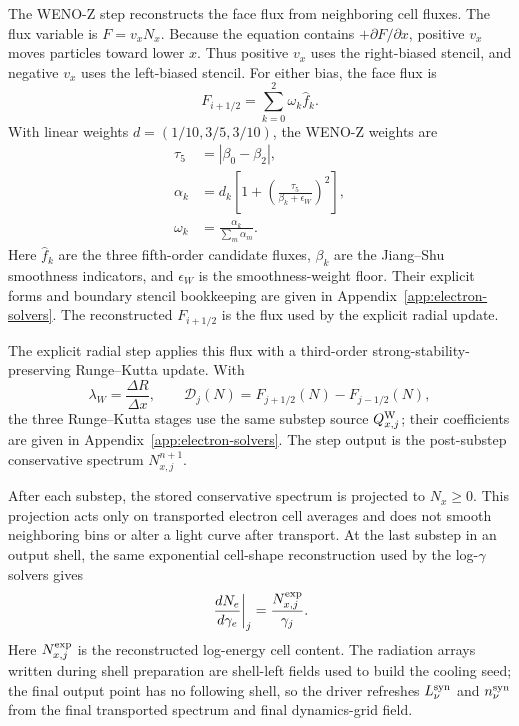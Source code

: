 \documentclass[twocolumn]{aastex702}
\begin{document}
The WENO-Z step reconstructs the face flux from neighboring cell fluxes.  The
flux variable is \(F=v_xN_x\).  Because the equation contains
\(+\partial F/\partial x\), positive \(v_x\) moves particles toward lower \(x\).
Thus positive \(v_x\) uses the right-biased stencil, and negative \(v_x\) uses
the left-biased stencil.  For either bias, the face flux is
\begin{equation}
F_{i+1/2}=\sum_{k=0}^{2}\omega_k\hat f_k .
\end{equation}
With linear weights \(d=(1/10,3/5,3/10)\), the WENO-Z weights are
\begin{equation}
\begin{aligned}
\tau_5&=|\beta_0-\beta_2|,\\
\alpha_k&=d_k\left[1+
\left(\frac{\tau_5}{\beta_k+\epsilon_W}\right)^2\right],
\\
\omega_k&=\frac{\alpha_k}{\sum_m\alpha_m}.
\end{aligned}
\end{equation}
Here \(\hat f_k\) are the three fifth-order candidate fluxes, \(\beta_k\) are the
Jiang--Shu smoothness indicators, and \(\epsilon_W\) is the smoothness-weight
floor.  Their explicit forms and boundary stencil bookkeeping are given in
Appendix~\ref{app:electron-solvers}.  The reconstructed \(F_{i+1/2}\) is the
flux used by the explicit radial update.

The explicit radial step applies this flux with a third-order
strong-stability-preserving Runge--Kutta update.  With
\begin{equation}
\lambda_W=\frac{\Delta R}{\Delta x},
\qquad
\mathcal{D}_j(N)=F_{j+1/2}(N)-F_{j-1/2}(N),
\end{equation}
the three Runge--Kutta stages use the same substep source \(Q_{x,j}^{\rm W}\);
their coefficients are given in Appendix~\ref{app:electron-solvers}.  The step
output is the post-substep conservative spectrum \(N_{x,j}^{n+1}\).

After each substep, the stored conservative spectrum is projected to
\(N_x\ge0\).  This projection acts only on transported electron cell averages
and does not smooth neighboring bins or alter a light curve after transport.  At
the last substep in an output shell, the same exponential cell-shape
reconstruction used by the log-\(\gamma\) solvers gives
\begin{equation}
\left.\frac{dN_e}{d\gamma_e}\right|_j
=\frac{N_{x,j}^{\rm exp}}{\gamma_j}.
\end{equation}
Here \(N_{x,j}^{\rm exp}\) is the reconstructed log-energy cell content.  The
radiation arrays written during shell preparation are shell-left fields used to
build the cooling seed; the final output point has no following shell, so the
driver refreshes \(L_\nu^{\rm syn}\) and \(n_\nu^{\rm syn}\) from the final
transported spectrum and final dynamics-grid field.
\end{document}
